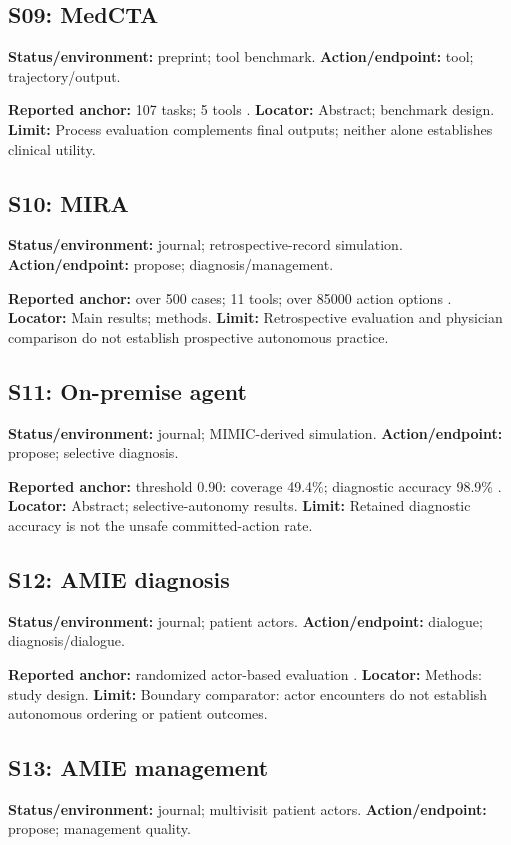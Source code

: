 \documentclass[journal,10pt]{IEEEtran}
\begin{document}
\subsection{S09: MedCTA}
\textbf{Status/environment:} preprint; tool benchmark. \textbf{Action/endpoint:} tool; trajectory/output.

\textbf{Reported anchor:} 107 tasks; 5 tools \cite{medcta2026}. \textbf{Locator:} Abstract; benchmark design. \textbf{Limit:} Process evaluation complements final outputs; neither alone establishes clinical utility.

\subsection{S10: MIRA}
\textbf{Status/environment:} journal; retrospective-record simulation. \textbf{Action/endpoint:} propose; diagnosis/management.

\textbf{Reported anchor:} over 500 cases; 11 tools; over 85000 action options \cite{mira2026}. \textbf{Locator:} Main results; methods. \textbf{Limit:} Retrospective evaluation and physician comparison do not establish prospective autonomous practice.

\subsection{S11: On-premise agent}
\textbf{Status/environment:} journal; MIMIC-derived simulation. \textbf{Action/endpoint:} propose; selective diagnosis.

\textbf{Reported anchor:} threshold 0.90: coverage 49.4\%; diagnostic accuracy 98.9\% \cite{onprem2026}. \textbf{Locator:} Abstract; selective-autonomy results. \textbf{Limit:} Retained diagnostic accuracy is not the unsafe committed-action rate.

\subsection{S12: AMIE diagnosis}
\textbf{Status/environment:} journal; patient actors. \textbf{Action/endpoint:} dialogue; diagnosis/dialogue.

\textbf{Reported anchor:} randomized actor-based evaluation \cite{amie2025}. \textbf{Locator:} Methods: study design. \textbf{Limit:} Boundary comparator: actor encounters do not establish autonomous ordering or patient outcomes.

\subsection{S13: AMIE management}
\textbf{Status/environment:} journal; multivisit patient actors. \textbf{Action/endpoint:} propose; management quality.
\end{document}
